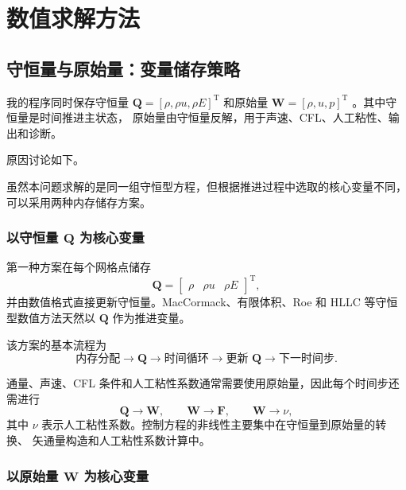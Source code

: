 \section{数值求解方法}

\subsection{守恒量与原始量：变量储存策略}

我的程序同时保存守恒量
$\bm{Q}=[\rho,\rho u,\rho E]^{\mathrm T}$ 和原始量
$\bm{W}=[\rho,u,p]^{\mathrm T}$ 。其中守恒量是时间推进主状态，
原始量由守恒量反解，用于声速、CFL、人工粘性、输出和诊断。

原因讨论如下。

虽然本问题求解的是同一组守恒型方程，但根据推进过程中选取的核心变量不同，
可以采用两种内存储存方案。

\subsubsection{以守恒量 \texorpdfstring{$\bm{Q}$}{Q} 为核心变量}

第一种方案在每个网格点储存
\begin{equation}
\bm{Q}=
\begin{bmatrix}
\rho & \rho u & \rho E
\end{bmatrix}^{\mathrm T},
\end{equation}
并由数值格式直接更新守恒量。MacCormack、有限体积、Roe 和 HLLC
等守恒型数值方法天然以 $\bm{Q}$ 作为推进变量。

该方案的基本流程为
\begin{equation}
\text{内存分配}
\longrightarrow
\bm{Q}
\longrightarrow
\text{时间循环}
\longrightarrow
\text{更新 }\bm{Q}
\longrightarrow
\text{下一时间步}.
\end{equation}

通量、声速、CFL 条件和人工粘性系数通常需要使用原始量，因此每个时间步还需进行
\begin{equation}
\bm{Q}\longrightarrow\bm{W},
\qquad
\bm{W}\longrightarrow\bm{F},
\qquad
\bm{W}\longrightarrow\nu,
\end{equation}
其中 $\nu$ 表示人工粘性系数。控制方程的非线性主要集中在守恒量到原始量的转换、
矢通量构造和人工粘性系数计算中。

\subsubsection{以原始量 \texorpdfstring{$\bm{W}$}{W} 为核心变量}

